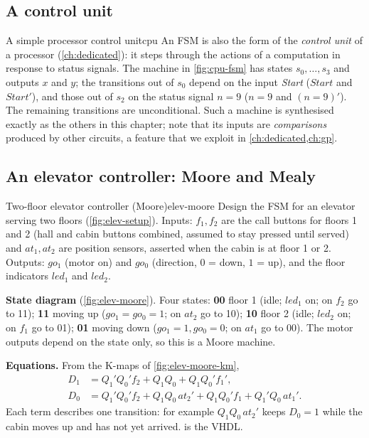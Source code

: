 \subsection{A control unit}
\begin{example}{A simple processor control unit}{cpu}
An FSM is also the form of the \emph{control unit} of a processor (\cref{ch:dedicated}): it steps through the actions of a computation in response to status signals. The machine in \cref{fig:cpu-fsm} has states $s_0,\dots,s_3$ and outputs $x$ and $y$; the transitions out of $s_0$ depend on the input \textit{Start} ($Start$ and $Start'$), and those out of $s_2$ on the status signal $n=9$ ($n=9$ and $(n=9)'$). The remaining transitions are unconditional. Such a machine is synthesised exactly as the others in this chapter; note that its inputs are \emph{comparisons} produced by other circuits, a feature that we exploit in \cref{ch:dedicated,ch:gp}.
\end{example}


\subsection{An elevator controller: Moore and Mealy}
\begin{example}{Two-floor elevator controller (Moore)}{elev-moore}
Design the FSM for an elevator serving two floors (\cref{fig:elev-setup}). Inputs: $f_1,f_2$ are the call buttons for floors 1 and 2 (hall and cabin buttons combined, assumed to stay pressed until served) and $at_1,at_2$ are position sensors, asserted when the cabin is at floor 1 or 2. Outputs: $go_1$ (motor on) and $go_0$ (direction, $0$ = down, $1$ = up), and the floor indicators $led_1$ and $led_2$.

\textbf{State diagram} (\cref{fig:elev-moore}). Four states: \textbf{00} floor 1 (idle; $led_1$ on; on $f_2$ go to 11); \textbf{11} moving up ($go_1=go_0=1$; on $at_2$ go to 10); \textbf{10} floor 2 (idle; $led_2$ on; on $f_1$ go to 01); \textbf{01} moving down ($go_1=1,go_0=0$; on $at_1$ go to 00). The motor outputs depend on the state only, so this is a Moore machine.

\textbf{Equations.} From the K-maps of \cref{fig:elev-moore-km},
\begin{align*}
 D_1 &= Q_1'Q_0'f_2 + Q_1Q_0 + Q_1Q_0'f_1',\\
 D_0 &= Q_1'Q_0'f_2 + Q_1Q_0\,at_2' + Q_1Q_0'f_1 + Q_1'Q_0\,at_1' .
\end{align*}
Each term describes one transition: for example $Q_1Q_0\,at_2'$ keeps $D_0=1$ while the cabin moves up and has not yet arrived.  is the VHDL.
\end{example}


